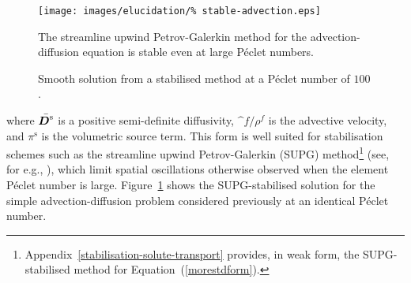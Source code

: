 \begin{figure}
  \begin{center}
    \texttt{[image: images/elucidation/\%
      stable-advection.eps]}
    \caption{Smooth solution from a stabilised method at a P\'eclet
      number of $100$.}
    \label{stable-solution}
  \end{center}
      {The streamline upwind Petrov-Galerkin method for the
        advection-diffusion equation is stable even at large P\'eclet
        numbers.}
\end{figure}

\noindent where $\bar{\mbox{\boldmath$ D$}^\mathrm{s}}$ is a positive semi-definite
diffusivity, $\bm^{f}/\rho^{f}$ is the advective velocity, and
$\pi^\mathrm{s}$ is the volumetric source term. This form is well
suited for stabilisation schemes such as the streamline upwind
Petrov-Galerkin (SUPG)
method\footnote{Appendix~\ref{stabilisation-solute-transport}
  provides, in weak form, the SUPG-stabilised method for
  Equation~(\ref{morestdform}).} (see, for e.g., \cite{Paper6}), which
limit spatial oscillations otherwise observed when the element
P\'eclet number is large. Figure~\ref{stable-solution} shows the
SUPG-stabilised solution for the simple advection-diffusion problem
considered previously at an identical P\'eclet number.

%


